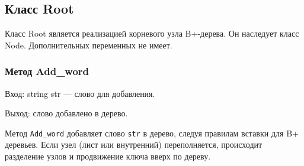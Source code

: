 \documentclass[10pt,a4paper,final]{article} %
\begin{document}
\subsection{Класс Root}
Класс Root является реализацией корневого узла B+-дерева. Он наследует класс Node. Дополнительных переменных не имеет.


\subsubsection{Метод Add\_word}
Вход: string str — слово для добавления. \par
Выход: слово добавлено в дерево. \par
\par Метод \texttt{Add\_word} добавляет слово \texttt{str} в дерево, следуя правилам вставки для B+ деревьев. Если узел (лист или внутренний) переполняется, происходит разделение узлов и продвижение ключа вверх по дереву.
\end{document}
